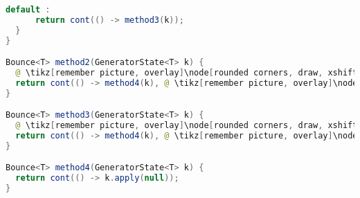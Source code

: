 \begin{center}
\begin{mdframed}[topline=true]
\begin{minipage}[t]{0.6\textwidth}
\begin{lstlisting}[language=Java, numbers=none, breaklines=true]
    default :
      return cont(() -> method3(k));
  }
}

Bounce<T> method2(GeneratorState<T> k) {
  @ \tikz[remember picture, overlay]\node[rounded corners, draw, xshift=-0.1cm, inner sep=5pt, anchor=west] {Kódrészlet \#1}; \vspace*{0.3cm} @
  return cont(() -> method4(k), @ \tikz[remember picture, overlay]\node[rounded corners, draw, xshift=-0.1cm, inner sep=5pt, anchor=west, yshift=0.1cm] {Kifejezés \#1}; \vspace*{0.2cm} \hspace*{1.75cm} @);
}

Bounce<T> method3(GeneratorState<T> k) {
  @ \tikz[remember picture, overlay]\node[rounded corners, draw, xshift=-0.1cm, inner sep=5pt, anchor=west] {Kódrészlet \#2}; \vspace*{0.3cm} @
  return cont(() -> method4(k), @ \tikz[remember picture, overlay]\node[rounded corners, draw, xshift=-0.1cm, inner sep=5pt, anchor=west, yshift=0.1cm] {Kifejezés \#2}; \vspace*{0.2cm} \hspace*{1.75cm} @);
}

Bounce<T> method4(GeneratorState<T> k) {
  return cont(() -> k.apply(null));
}
\end{lstlisting} 
\end{minipage}
\end{mdframed}
\end{center}
